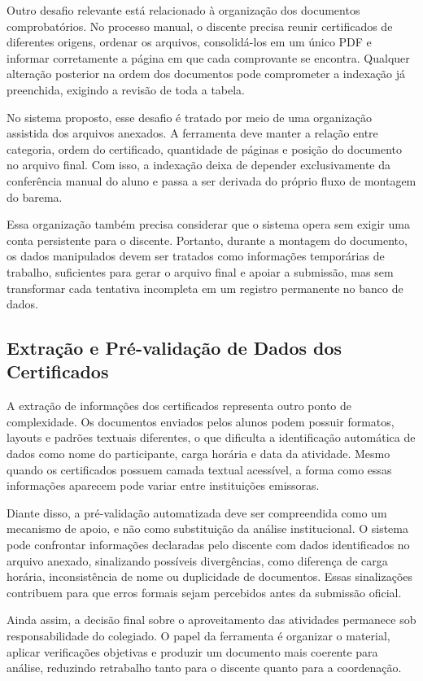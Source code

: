 Outro desafio relevante está relacionado à organização dos documentos comprobatórios. No processo manual, o discente precisa reunir certificados de diferentes origens, ordenar os arquivos, consolidá-los em um único PDF e informar corretamente a página em que cada comprovante se encontra. Qualquer alteração posterior na ordem dos documentos pode comprometer a indexação já preenchida, exigindo a revisão de toda a tabela.

No sistema proposto, esse desafio é tratado por meio de uma organização assistida dos arquivos anexados. A ferramenta deve manter a relação entre categoria, ordem do certificado, quantidade de páginas e posição do documento no arquivo final. Com isso, a indexação deixa de depender exclusivamente da conferência manual do aluno e passa a ser derivada do próprio fluxo de montagem do barema.

Essa organização também precisa considerar que o sistema opera sem exigir uma conta persistente para o discente. Portanto, durante a montagem do documento, os dados manipulados devem ser tratados como informações temporárias de trabalho, suficientes para gerar o arquivo final e apoiar a submissão, mas sem transformar cada tentativa incompleta em um registro permanente no banco de dados.

\subsection{Extração e Pré-validação de Dados dos Certificados}

A extração de informações dos certificados representa outro ponto de complexidade. Os documentos enviados pelos alunos podem possuir formatos, layouts e padrões textuais diferentes, o que dificulta a identificação automática de dados como nome do participante, carga horária e data da atividade. Mesmo quando os certificados possuem camada textual acessível, a forma como essas informações aparecem pode variar entre instituições emissoras.

Diante disso, a pré-validação automatizada deve ser compreendida como um mecanismo de apoio, e não como substituição da análise institucional. O sistema pode confrontar informações declaradas pelo discente com dados identificados no arquivo anexado, sinalizando possíveis divergências, como diferença de carga horária, inconsistência de nome ou duplicidade de documentos. Essas sinalizações contribuem para que erros formais sejam percebidos antes da submissão oficial.

Ainda assim, a decisão final sobre o aproveitamento das atividades permanece sob responsabilidade do colegiado. O papel da ferramenta é organizar o material, aplicar verificações objetivas e produzir um documento mais coerente para análise, reduzindo retrabalho tanto para o discente quanto para a coordenação.

